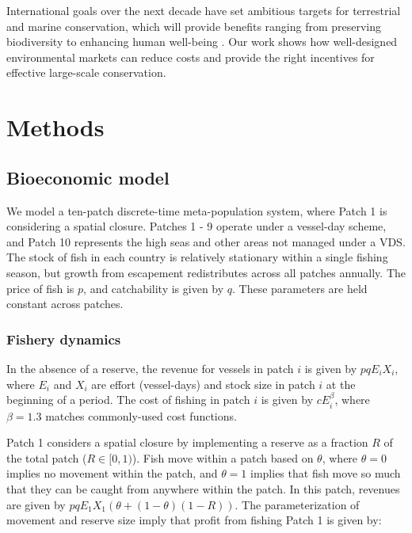\documentclass[12pt]{article}
\begin{document}
International goals over the next decade have set ambitious targets for terrestrial and marine conservation, which will provide benefits ranging from preserving biodiversity to enhancing human well-being \cite{oleary_2016,dinerstein_2019,roberts_2017,ban_2019}. Our work shows how well-designed environmental markets can reduce costs and provide the right incentives for effective large-scale conservation.

\clearpage

\section{Methods}

\subsection{Bioeconomic model}

We model a ten-patch discrete-time meta-population system, where Patch 1 is considering a spatial closure. Patches 1 - 9 operate under a vessel-day scheme, and Patch 10 represents the high seas and other areas not managed under a VDS. The stock of fish in each country is relatively stationary within a single fishing season, but  growth from escapement redistributes across all patches annually. The price of fish is $p$, and catchability is given by $q$. These parameters are held constant across patches.

\subsubsection{Fishery dynamics}

In the absence of a reserve, the revenue for vessels in patch $i$ is given by $pqE_iX_i$, where $E_i$ and $X_i$ are effort (vessel-days) and stock size in patch $i$ at the beginning of a period. The cost of fishing in patch $i$ is given by $cE_i^\beta$, where $\beta = 1.3$ matches commonly-used cost functions.

Patch 1 considers a spatial closure by implementing a reserve as a fraction $R$ of the total patch ($R \in[0,1)$). Fish move within a patch based on $\theta$, where $\theta = 0$ implies no movement within the patch, and $\theta = 1$ implies that fish move so much that they can be caught from anywhere within the patch. In this patch, revenues are given by $pqE_1X_1(\theta + (1 - \theta)(1 - R))$. The parameterization of movement and reserve size imply that profit from fishing Patch 1 is given by:
\end{document}
